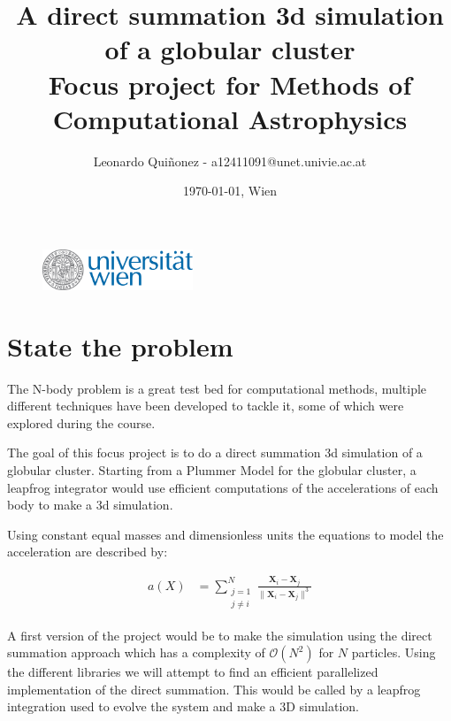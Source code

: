 \documentclass[a4paper, 11pt]{article}         %
\makeatletter
\newcommand{\titlefirstpage}{A direct summation 3d simulation of a globular cluster}
\newcommand{\authorname}{Leonardo Quiñonez}
\newcommand{\authormail}{a12411091@unet.univie.ac.at}
\newcommand{\authordate}{\today{}}
\newcommand{\authorplace}{Wien}
\makeatother
\begin{document}
\begin{figure}                                  %
\flushleft
\includegraphics[width=0.4\textwidth]{univienna-logo.eps}
\end{figure}

\title{\titlefirstpage{} \\ \large Focus project for Methods of Computational Astrophysics}

\author{\authorname{} - \authormail{}}
\date{\authordate, \authorplace}

\maketitle                                      %

\section{State the problem}                              %

The N-body problem is a great test bed for computational methods,
multiple different techniques have been developed to tackle it, some of which were explored during the course. \parencite{Hahn2025classnotes}

The goal of this focus project is to do a direct summation 3d simulation of a globular cluster. 
Starting from a Plummer Model for the globular cluster, a leapfrog integrator would use efficient computations
of the accelerations of each body to make a 3d simulation.

Using constant equal masses and dimensionless units the equations to model the acceleration are described by:

\begin{subequations}
\begin{align}
    a(X) &= \sum_{\substack{j=1 \\ j \ne i}}^{N} \frac{\mathbf{X}_i - \mathbf{X}_j}{\|\mathbf{X}_i - \mathbf{X}_j\|^3} \label{eq:motion_b}
\end{align}
\end{subequations}

A first version of the project would be to make the simulation using the direct summation approach which has a complexity of \( \mathcal{O}(N^2) \) for \( N \) particles.
Using the different libraries we will attempt to find an efficient parallelized implementation of the direct summation.
This would be called by a leapfrog integration used to evolve the system and make a 3D simulation.
\end{document}
